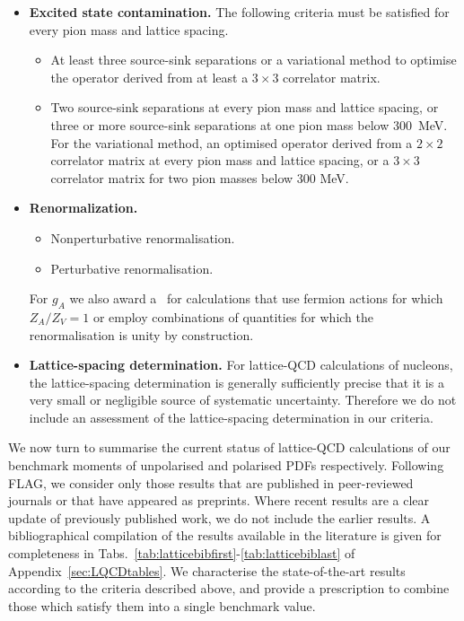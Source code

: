 \begin{itemize}
\item {\bfseries Excited state contamination.} 
The following criteria must be satisfied for every pion mass and lattice 
spacing.
%
\begin{itemize}
%
\item[\bstar] At least three source-sink separations or a variational method 
to optimise the operator derived from at least a $3\times 3$ correlator matrix.
% 
\item[\bcirc] Two source-sink separations at every pion mass and lattice 
spacing, or three or more source-sink separations at one pion mass below 
300~MeV. 
%
For the variational method, an optimised operator derived from a $2\times 2$ 
correlator matrix at every pion mass and lattice spacing, or a $3\times 3$ 
correlator matrix for two pion masses below 300 MeV.
%
\end{itemize}

\item {\bfseries Renormalization.} 
\begin{itemize}
%
\item[\bstar] Nonperturbative renormalisation.
%
\item[\bcirc] Perturbative renormalisation.
%
\end{itemize}
%
For $g_A$ we also award a \bstar~for calculations that use fermion actions 
for which $Z_A/Z_V=1$ or employ combinations of quantities for which the 
renormalisation is unity by construction.

\item {\bfseries Lattice-spacing determination.} 
For lattice-QCD calculations of nucleons, the lattice-spacing determination is 
generally sufficiently precise that it is a very small or negligible source
of systematic uncertainty. 
%
Therefore we do not include an assessment of the lattice-spacing
determination in our criteria.

\end{itemize}

We now turn to summarise the current status of lattice-QCD calculations of
our benchmark moments of unpolarised and polarised PDFs respectively.
%
Following FLAG, we consider only those results that are published in 
peer-reviewed journals or that have appeared as preprints. 
%
Where recent results are a clear update of previously published work, we do 
not include the earlier results.
%
A bibliographical compilation of the results available in the literature 
is given for completeness in 
Tabs.~\ref{tab:latticebibfirst}-\ref{tab:latticebiblast} 
of Appendix~\ref{sec:LQCDtables}.
%
We characterise the state-of-the-art results according to the criteria 
described above, and provide a prescription to combine those which satisfy 
them into a single benchmark value.

